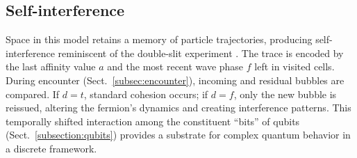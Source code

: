 \documentclass{ijuc}
\begin{document}
\subsection{Self-interference\label{subsec:Interference}}
Space in this model retains a memory of particle trajectories, producing self-interference reminiscent of the double-slit experiment \cite{feynman-2}. The trace is encoded by the last affinity value $a$ and the most recent wave phase $f$ left in visited cells.
During encounter (Sect.~\ref{subsec:encounter}), incoming and residual bubbles are compared. If $d=t$, standard cohesion occurs; if $d=f$, only the new bubble is reissued, altering the fermion's dynamics and creating interference patterns. This temporally shifted interaction among the constituent ``bits'' of qubits (Sect.~\ref{subsection:qubits}) provides a substrate for complex quantum behavior in a discrete framework.
\end{document}
